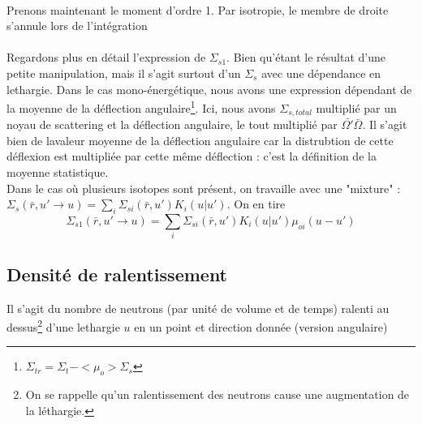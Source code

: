 	\ \\
	
	Prenons maintenant le moment d'ordre 1. Par isotropie, le membre de droite s'annule lors de 
	l'intégration\\
	
	\ \\
	
	Regardons plus en détail l'expression de $\Sigma_{s1}$. Bien qu'étant le résultat d'une petite
	manipulation, mais il s'agit surtout d'un $\Sigma_s$ avec une dépendance en lethargie. Dans le 
	cas mono-énergétique, nous avons une expression dépendant de la moyenne de la déflection 
	angulaire\footnote{${\Sigma _{tr}} = {\Sigma _t} -  < {\mu _o} > {\Sigma _s}$}. Ici, nous 
	avons $\Sigma_{s,total}$ multiplié par un noyau de scattering et la déflection angulaire, le tout
	multiplié par $\bar{\Omega'}\bar\Omega$. Il s'agit bien de lavaleur moyenne de la déflection 
	angulaire car la distrubtion de cette déflexion est multipliée par cette même déflection : c'est
	la définition de la moyenne statistique. \\
	
	Dans le cas où plusieurs isotopes sont présent, on travaille avec une "mixture" :${\Sigma _s}
	(\bar r,u' \to u) = \sum\limits_i  {\Sigma _{si}}(\bar r,u'){K_i}(u|u')$. On en tire
	\begin{equation}
	{\Sigma _{s1}}(\bar r,u' \to u) = \sum\limits_i  {\Sigma _{si}}(\bar r,u'){K_i}(u|u'){\mu 
	 _{oi}}(u - u')
	\end{equation}
	
	
	\subsection{Densité de ralentissement}	
	Il s'agit du nombre de neutrons (par unité de volume et de temps) ralenti au dessus\footnote{On 
	se rappelle qu'un ralentissement des neutrons cause une augmentation de la léthargie.} d'une 
	lethargie $u$ en un point et direction donnée (version angulaire)\\
	
